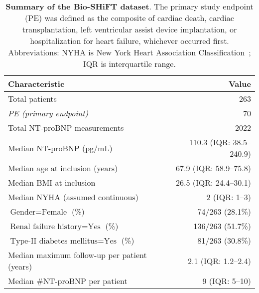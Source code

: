 \begin{table}
\small
\centering
\caption{\textbf{Summary of the Bio-SHiFT dataset}. The primary study endpoint (PE) was defined as the composite of cardiac death, cardiac transplantation, left ventricular assist device implantation, or hospitalization for heart failure, whichever occurred first. Abbreviations: NYHA is New York Heart Association Classification~\citep{bredy2018new}; IQR is interquartile range.}
\label{c1:table:2}
\begin{tabular}{p{8cm}r}
\toprule
\textbf{Characteristic} & Value\\
\midrule
Total patients & 263\\
\emph{PE (primary endpoint)}  & 70\\
\midrule
Total NT-proBNP measurements & 2022\\
Median NT-proBNP (pg/mL)  & 110.3 (IQR: 38.5--240.9)\\
Median age at inclusion (years)  & 67.9 (IQR: 58.9--75.8)\\
Median BMI at inclusion  & 26.5 (IQR: 24.4--30.1)\\
Median NYHA (assumed continuous) & 2 (IQR: 1--3)\\
$\mbox{Gender} = \mbox{Female}$ (\%) & 74/263 (28.1\%)\\
$\mbox{Renal failure history} = \mbox{Yes}$ (\%) & 136/263 (51.7\%)\\
$\mbox{Type-II diabetes mellitus} = \mbox{Yes}$ (\%) & 81/263 (30.8\%)\\
\midrule
Median maximum follow-up per patient (years)  & 2.1 (IQR: 1.2--2.4)\\
Median \#NT-proBNP per patient  & 9 (IQR: 5--10)\\
\bottomrule
\end{tabular}
\end{table}